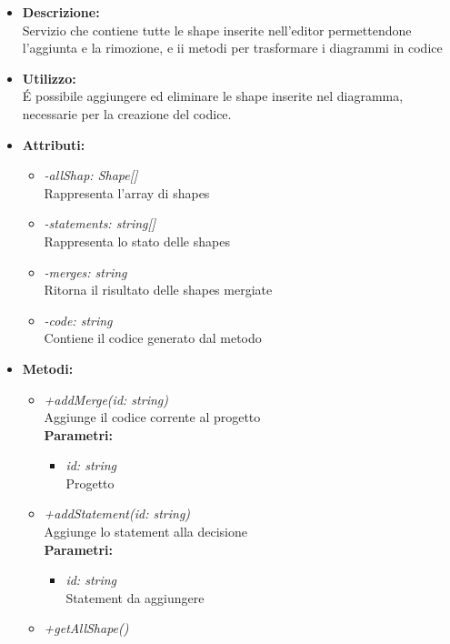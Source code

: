 \begin{itemize}
	\item \textbf{Descrizione:}\\
	Servizio che contiene tutte le shape inserite nell'editor permettendone l'aggiunta e la rimozione, e ii metodi per trasformare i diagrammi in codice
	\item \textbf{Utilizzo:}\\
	É possibile aggiungere ed eliminare le shape inserite nel diagramma, necessarie per la creazione del codice.
	
	\item \textbf{Attributi:}
		\begin{itemize}
			\item \emph{-allShap: Shape[]}\\
			Rappresenta l'array di shapes
			\item \emph{-statements: string[]}\\
			Rappresenta lo stato delle shapes
			\item \emph{-merges: string}\\
			Ritorna il risultato delle shapes mergiate
			\item \emph{-code: string}\\
			Contiene il codice generato dal metodo
		\end{itemize}
	\item \textbf{Metodi:}
		\begin{itemize}
			\item \emph{+addMerge(id: string)}\\
    		Aggiunge il codice corrente al progetto\\
    		\textbf{Parametri:}
    		\begin{itemize}
    			\item \emph{id: string}\\
    			Progetto
    		\end{itemize}
    		\item \emph{+addStatement(id: string)}\\
    		Aggiunge lo statement alla decisione\\
    		\textbf{Parametri:}
    		\begin{itemize}
    			\item \emph{id: string}\\
    			Statement da aggiungere
    		\end{itemize}
    		\item \emph{+getAllShape()}\\

\end{itemize}
\end{itemize}
